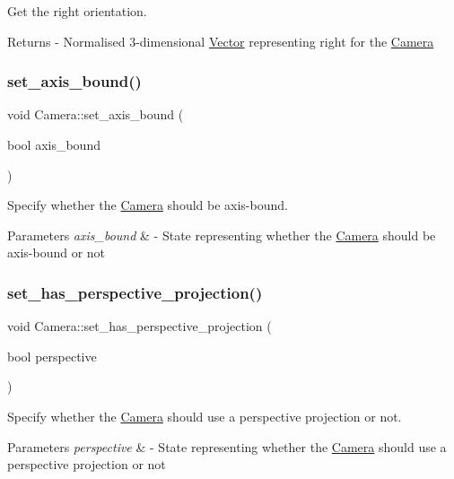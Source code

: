 Get the right orientation. \begin{DoxyReturn}{Returns}
-\/ Normalised 3-\/dimensional \mbox{\hyperlink{class_vector}{Vector}} representing \textquotesingle{}right\textquotesingle{} for the \mbox{\hyperlink{class_camera}{Camera}} 
\end{DoxyReturn}
\mbox{\label{class_camera_a9f003408eb5324f88cca52221d825c8b}} 
\subsubsection{\texorpdfstring{set\+\_\+axis\+\_\+bound()}{set\_axis\_bound()}}
{\footnotesize\ttfamily void Camera\+::set\+\_\+axis\+\_\+bound (\begin{DoxyParamCaption}\item[{bool}]{axis\+\_\+bound }\end{DoxyParamCaption})}

Specify whether the \mbox{\hyperlink{class_camera}{Camera}} should be axis-\/bound. 
\begin{DoxyParams}{Parameters}
{\em axis\+\_\+bound} & -\/ State representing whether the \mbox{\hyperlink{class_camera}{Camera}} should be axis-\/bound or not \\
\hline
\end{DoxyParams}
\mbox{\label{class_camera_af88ca0b5be539ddf342dbdd0e2fb0f78}} 
\subsubsection{\texorpdfstring{set\+\_\+has\+\_\+perspective\+\_\+projection()}{set\_has\_perspective\_projection()}}
{\footnotesize\ttfamily void Camera\+::set\+\_\+has\+\_\+perspective\+\_\+projection (\begin{DoxyParamCaption}\item[{bool}]{perspective }\end{DoxyParamCaption})}

Specify whether the \mbox{\hyperlink{class_camera}{Camera}} should use a perspective projection or not. 
\begin{DoxyParams}{Parameters}
{\em perspective} & -\/ State representing whether the \mbox{\hyperlink{class_camera}{Camera}} should use a perspective projection or not \\
\hline
\end{DoxyParams}
\mbox{\label{class_camera_adc0b6b6acc31e820f499733a8b242fd6}} 
